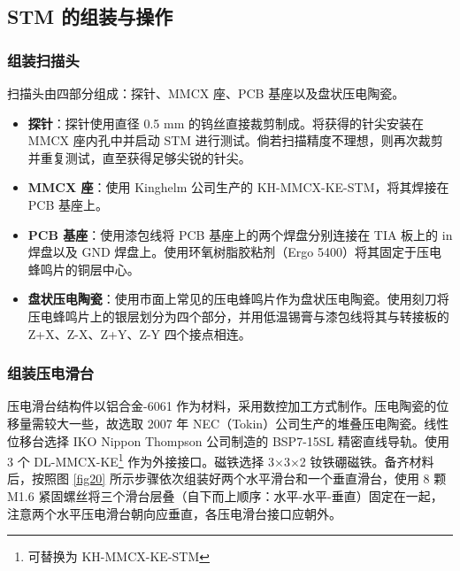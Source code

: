 \documentclass{article}
\begin{document}
\begin{spacing}{1.5}
	
	
	
	
	
	\subsection{STM 的组装与操作}
	\subsubsection{组装扫描头}
	扫描头由四部分组成：探针、MMCX 座、PCB 基座以及盘状压电陶瓷。
	\begin{itemize}
		\item \textbf{探针}：探针使用直径 0.5 mm 的钨丝直接裁剪制成。将获得的针尖安装在 MMCX 座内孔中并启动 STM 进行测试。倘若扫描精度不理想，则再次裁剪并重复测试，直至获得足够尖锐的针尖。
		
		\item \textbf{MMCX 座}：使用 Kinghelm 公司生产的 KH-MMCX-KE-STM，将其焊接在 PCB 基座上。
		
		\item \textbf{PCB 基座}：使用漆包线将 PCB 基座上的两个焊盘分别连接在 TIA 板上的 in 焊盘以及 GND 焊盘上。使用环氧树脂胶粘剂（Ergo 5400）将其固定于压电蜂鸣片的铜层中心。
		
		\item \textbf{盘状压电陶瓷}：使用市面上常见的压电蜂鸣片作为盘状压电陶瓷。使用刻刀将压电蜂鸣片上的银层划分为四个部分，并用低温锡膏与漆包线将其与转接板的 Z+X、Z-X、Z+Y、Z-Y 四个接点相连。
		
	\end{itemize}
	
	
	
	
	
	
	
	\subsubsection{组装压电滑台}
	压电滑台结构件以铝合金-6061 作为材料，采用数控加工方式制作。压电陶瓷的位移量需较大一些，故选取 2007 年 NEC（Tokin）公司生产的堆叠压电陶瓷。线性位移台选择 IKO Nippon Thompson 公司制造的 BSP7-15SL 精密直线导轨。使用 3 个 DL-MMCX-KE\footnote{可替换为 KH-MMCX-KE-STM} 作为外接接口。磁铁选择 3$\times$3$\times$2 钕铁硼磁铁。备齐材料后，按照图 \ref{fig20} 所示步骤依次组装好两个水平滑台和一个垂直滑台，使用 8 颗 M1.6 紧固螺丝将三个滑台层叠（自下而上顺序：水平-水平-垂直）固定在一起，注意两个水平压电滑台朝向应垂直，各压电滑台接口应朝外。
	

\end{spacing}
\end{document}
